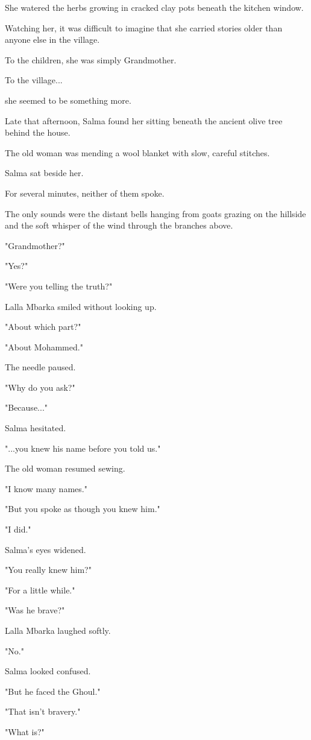 \documentclass[12pt,openany]{book}
\begin{document}
She watered the herbs growing in cracked clay pots beneath the kitchen window.

Watching her, it was difficult to imagine that she carried stories older than anyone else in the village.

To the children, she was simply Grandmother.

To the village...

she seemed to be something more.

Late that afternoon, Salma found her sitting beneath the ancient olive tree behind the house.

The old woman was mending a wool blanket with slow, careful stitches.

Salma sat beside her.

For several minutes, neither of them spoke.

The only sounds were the distant bells hanging from goats grazing on the hillside and the soft whisper of the wind through the branches above.

"Grandmother?"

"Yes?"

"Were you telling the truth?"

Lalla Mbarka smiled without looking up.

"About which part?"

"About Mohammed."

The needle paused.

"Why do you ask?"

"Because..."

Salma hesitated.

"...you knew his name before you told us."

The old woman resumed sewing.

"I know many names."

"But you spoke as though you knew him."

"I did."

Salma's eyes widened.

"You really knew him?"

"For a little while."

"Was he brave?"

Lalla Mbarka laughed softly.

"No."

Salma looked confused.

"But he faced the Ghoul."

"That isn't bravery."

"What is?"
\end{document}
